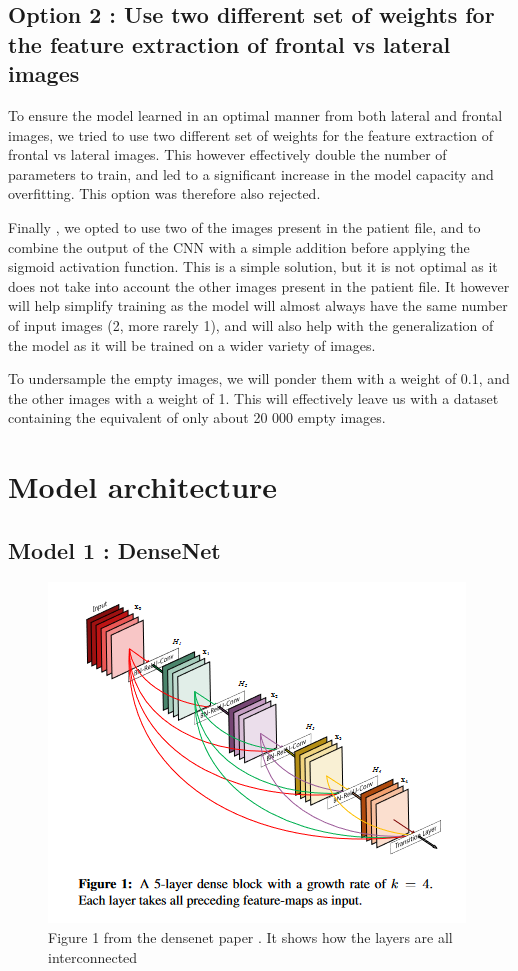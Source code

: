 \documentclass[11pt]{article}
\begin{document}
    \subsection{Option 2 : Use two different set of weights for the feature extraction of frontal vs lateral images}

        To ensure the model learned in an optimal manner from both lateral and frontal images, we tried to use two different set of weights for the feature extraction of frontal vs lateral images. This however
        effectively double the number of parameters to train, and led to a significant increase in the model capacity and overfitting. This option was therefore also rejected.

    Finally , we opted to use two of the images present in the patient file, and to combine the output of the CNN with a simple addition before applying the sigmoid activation function. This is a simple solution, but it is not optimal as it does not take into account the other images present in the patient file.
    It however will help simplify training as the model will almost always have the same number of input images (2, more rarely 1), and will also help with the generalization of the model as it will be trained on a wider variety of images.

    To undersample the empty images, we will ponder them with a weight of 0.1, and the other images with a weight of 1. This will effectively leave us with a dataset containing the equivalent of only about 20 000 empty images.





    \section{Model architecture}

    \subsection{Model 1 : DenseNet \cite{densenet}}


    \begin{figure}[h]

         \centering
         \includegraphics[width=0.5 \textwidth]{plots/densenet_figure}
         \caption{Figure 1 from the densenet paper \cite{densenet}. It shows how the layers are all interconnected}
         \label{fig:densenet_figure}

    \end{figure}
\end{document}
